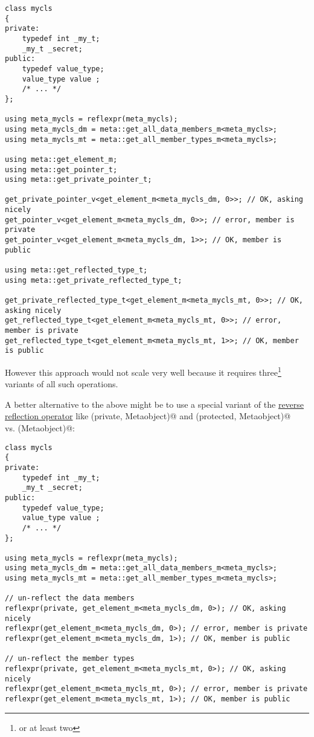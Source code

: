 \begin{verbatim}
class mycls
{
private:
	typedef int _my_t;
	_my_t _secret;
public:
	typedef value_type;
	value_type value ;
	/* ... */
};

using meta_mycls = reflexpr(meta_mycls);
using meta_mycls_dm = meta::get_all_data_members_m<meta_mycls>;
using meta_mycls_mt = meta::get_all_member_types_m<meta_mycls>;

using meta::get_element_m;
using meta::get_pointer_t;
using meta::get_private_pointer_t;

get_private_pointer_v<get_element_m<meta_mycls_dm, 0>>; // OK, asking nicely
get_pointer_v<get_element_m<meta_mycls_dm, 0>>; // error, member is private
get_pointer_v<get_element_m<meta_mycls_dm, 1>>; // OK, member is public

using meta::get_reflected_type_t;
using meta::get_private_reflected_type_t;

get_private_reflected_type_t<get_element_m<meta_mycls_mt, 0>>; // OK, asking nicely
get_reflected_type_t<get_element_m<meta_mycls_mt, 0>>; // error, member is private
get_reflected_type_t<get_element_m<meta_mycls_mt, 1>>; // OK, member is public
\end{verbatim}

However this approach would not scale very well because it requires three\footnote
{or at least two} variants of all such operations.

A better alternative to the above might be to use a special variant of the
\hyperref[fut-reverse-reflection]{reverse reflection operator} like
\verb@reflexpr(private, Metaobject)@ and \verb@reflexpr(protected, Metaobject)@\\
vs. \verb@reflexpr(Metaobject)@:

\begin{verbatim}
class mycls
{
private:
	typedef int _my_t;
	_my_t _secret;
public:
	typedef value_type;
	value_type value ;
	/* ... */
};

using meta_mycls = reflexpr(meta_mycls);
using meta_mycls_dm = meta::get_all_data_members_m<meta_mycls>;
using meta_mycls_mt = meta::get_all_member_types_m<meta_mycls>;

// un-reflect the data members
reflexpr(private, get_element_m<meta_mycls_dm, 0>); // OK, asking nicely
reflexpr(get_element_m<meta_mycls_dm, 0>); // error, member is private
reflexpr(get_element_m<meta_mycls_dm, 1>); // OK, member is public

// un-reflect the member types
reflexpr(private, get_element_m<meta_mycls_mt, 0>); // OK, asking nicely
reflexpr(get_element_m<meta_mycls_mt, 0>); // error, member is private
reflexpr(get_element_m<meta_mycls_mt, 1>); // OK, member is public
\end{verbatim}

